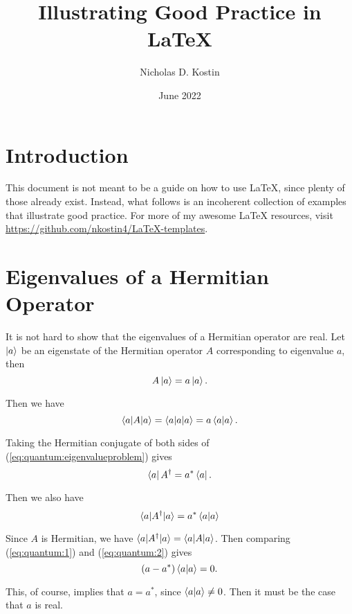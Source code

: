 \documentclass{article}
\title{Illustrating Good Practice in {\LaTeX}}
\author{Nicholas D. Kostin}
\date{June 2022}
\numberwithin{equation}{section}
\begin{document}
\maketitle

\section{Introduction}

This document is not meant to be a guide on how to use {\LaTeX}, since plenty of those already exist. Instead, what follows is an incoherent collection of examples that illustrate good practice. For more of my awesome {\LaTeX} resources, visit \url{https://github.com/nkostin4/LaTeX-templates}.

\section{Eigenvalues of a Hermitian Operator}

It is not hard to show that the eigenvalues of a Hermitian operator are real. Let $\ket{a}$ be an eigenstate of the Hermitian operator $A$ corresponding to eigenvalue $a$, then
\begin{equation}
    A \ket{a} = a \ket{a}. \label{eq:quantum:eigenvalueproblem}
\end{equation}

Then we have
\begin{equation}
    \braket{a|A|a} = \braket{a|a|a} = a\braket{a|a}. \label{eq:quantum:1}
\end{equation}

Taking the Hermitian conjugate of both sides of (\ref{eq:quantum:eigenvalueproblem}) gives
\begin{equation}
    \bra{a} A^{\dagger} = a^{*} \bra{a}.
\end{equation}

Then we also have
\begin{equation}
    \braket{a|A^{\dagger}|a} = a^{*} \braket{a|a} \label{eq:quantum:2}
\end{equation}

Since $A$ is Hermitian, we have $\braket{a|A^{\dagger}|a} = \braket{a|A|a}$. Then comparing (\ref{eq:quantum:1}) and (\ref{eq:quantum:2}) gives
\begin{equation*}
    \left( a - a^* \right) \braket{a|a} = 0.
\end{equation*}

This, of course, implies that $a = a^*$, since $\braket{a|a} \neq 0$. Then it must be the case that $a$ is real.
\end{document}
